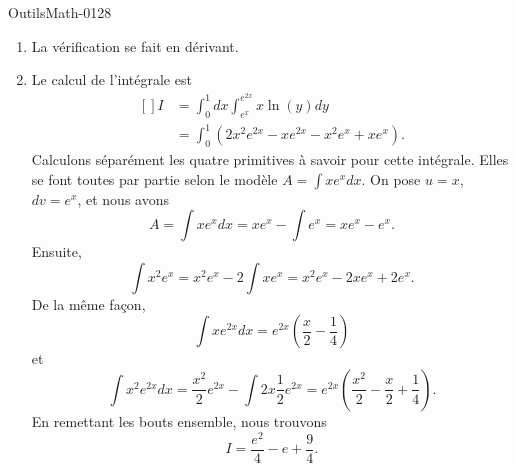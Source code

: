 
\begin{corrige}{OutilsMath-0128}

    \begin{enumerate}
        \item
            La vérification se fait en dérivant.
        \item
            Le calcul de l'intégrale est
            \begin{equation}
                \begin{aligned}[]
                    I&=\int_0^1dx\int_{ e^{x}}^{ e^{2x}}x\ln(y)dy\\
                    &=\int_0^1(2x^2 e^{2x}-x e^{2x}-x^2 e^{x}+xe^x).
                \end{aligned}
            \end{equation}
            Calculons séparément les quatre primitives à savoir pour cette intégrale. Elles se font toutes par partie selon le modèle \( A=\int x e^{x}dx\). On pose \( u=x\), \( dv=e^x\), et nous avons
            \begin{equation}
                A=\int x e^{x}dx=xe^x-\int e^x=xe^x-e^x.
            \end{equation}
            Ensuite,
            \begin{equation}
                \int x^2e^x=x^2e^x-2\int xe^x=x^2e^x-2xe^x+2e^x.
            \end{equation}
            De la même façon,
            \begin{equation}
                \int xe^{2x}dx=e^{2x}\left( \frac{ x }{2}-\frac{1}{ 4 } \right)
            \end{equation}
            et
            \begin{equation}
                \int x^2 e^{2x}dx=\frac{ x^2 }{2} e^{2x}-\int 2x\frac{ 1 }{2} e^{2x}= e^{2x}\left( \frac{ x^2 }{2}-\frac{ x }{2}+\frac{1}{ 4 } \right).
            \end{equation}
            En remettant les bouts ensemble, nous trouvons
            \begin{equation}
                I=\frac{ e^2 }{ 4 }-e+\frac{ 9 }{ 4 }.
            \end{equation}


\end{enumerate}
\end{corrige}
